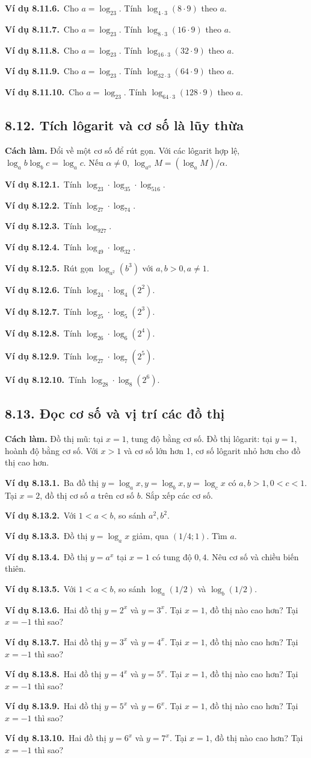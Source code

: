 \documentclass[11pt,a4paper]{article}
\newcommand{\vd}[1]{\par\Needspace{3\baselineskip}\textbf{\color{teal}Ví dụ #1.}\ }
\begin{document}
\vd{8.11.6}Cho $a=\log_23$. Tính $\log_{4\cdot3}(8\cdot9)$ theo $a$.
\vd{8.11.7}Cho $a=\log_23$. Tính $\log_{8\cdot3}(16\cdot9)$ theo $a$.
\vd{8.11.8}Cho $a=\log_23$. Tính $\log_{16\cdot3}(32\cdot9)$ theo $a$.
\vd{8.11.9}Cho $a=\log_23$. Tính $\log_{32\cdot3}(64\cdot9)$ theo $a$.
\vd{8.11.10}Cho $a=\log_23$. Tính $\log_{64\cdot3}(128\cdot9)$ theo $a$.
\clearpage\subsection{8.12. Tích lôgarit và cơ số là lũy thừa}
\begin{tcolorbox}\textbf{Cách làm.} Đổi về một cơ số để rút gọn. Với các lôgarit hợp lệ, $\log_ab\log_bc=\log_ac$. Nếu $\alpha\ne0$, $\log_{a^\alpha}M=(\log_aM)/\alpha$.\end{tcolorbox}
\vd{8.12.1}Tính $\log_23\cdot\log_35\cdot\log_516$.
\vd{8.12.2}Tính $\log_27\cdot\log_74$.
\vd{8.12.3}Tính $\log_927$.
\vd{8.12.4}Tính $\log_49\cdot\log_32$.
\vd{8.12.5}Rút gọn $\log_{a^2}(b^3)$ với $a,b>0,a\ne1$.
\vd{8.12.6}Tính $\log_24\cdot\log_{4}(2^{2})$.
\vd{8.12.7}Tính $\log_25\cdot\log_{5}(2^{3})$.
\vd{8.12.8}Tính $\log_26\cdot\log_{6}(2^{4})$.
\vd{8.12.9}Tính $\log_27\cdot\log_{7}(2^{5})$.
\vd{8.12.10}Tính $\log_28\cdot\log_{8}(2^{6})$.
\clearpage\subsection{8.13. Đọc cơ số và vị trí các đồ thị}
\begin{tcolorbox}\textbf{Cách làm.} Đồ thị mũ: tại $x=1$, tung độ bằng cơ số. Đồ thị lôgarit: tại $y=1$, hoành độ bằng cơ số. Với $x>1$ và cơ số lớn hơn 1, cơ số lôgarit nhỏ hơn cho đồ thị cao hơn.\end{tcolorbox}
\vd{8.13.1}Ba đồ thị $y=\log_ax,y=\log_bx,y=\log_cx$ có $a,b>1,0<c<1$. Tại $x=2$, đồ thị cơ số $a$ trên cơ số $b$. Sắp xếp các cơ số.
\vd{8.13.2}Với $1<a<b$, so sánh $a^2,b^2$.
\vd{8.13.3}Đồ thị $y=\log_ax$ giảm, qua $(1/4;1)$. Tìm $a$.
\vd{8.13.4}Đồ thị $y=a^x$ tại $x=1$ có tung độ $0{,}4$. Nêu cơ số và chiều biến thiên.
\vd{8.13.5}Với $1<a<b$, so sánh $\log_a(1/2)$ và $\log_b(1/2)$.
\vd{8.13.6}Hai đồ thị $y=2^x$ và $y=3^x$. Tại $x=1$, đồ thị nào cao hơn? Tại $x=-1$ thì sao?
\vd{8.13.7}Hai đồ thị $y=3^x$ và $y=4^x$. Tại $x=1$, đồ thị nào cao hơn? Tại $x=-1$ thì sao?
\vd{8.13.8}Hai đồ thị $y=4^x$ và $y=5^x$. Tại $x=1$, đồ thị nào cao hơn? Tại $x=-1$ thì sao?
\vd{8.13.9}Hai đồ thị $y=5^x$ và $y=6^x$. Tại $x=1$, đồ thị nào cao hơn? Tại $x=-1$ thì sao?
\vd{8.13.10}Hai đồ thị $y=6^x$ và $y=7^x$. Tại $x=1$, đồ thị nào cao hơn? Tại $x=-1$ thì sao?
\end{document}
